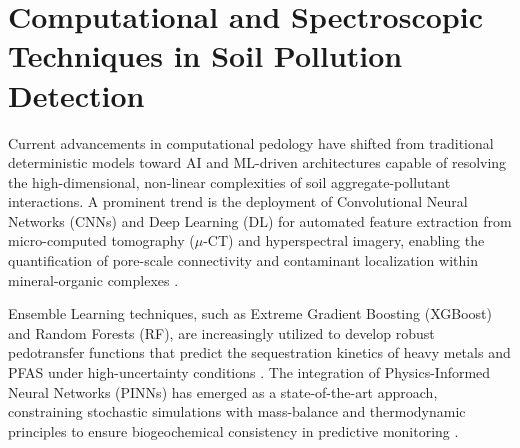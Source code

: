 \documentclass[land,article,submit,pdftex,moreauthors]{Definitions/mdpi}
\begin{document}
\section{Computational and Spectroscopic Techniques in Soil Pollution
    Detection}\label{sec3}

Current advancements in computational pedology have shifted from traditional
deterministic models toward AI and ML-driven architectures capable of
resolving the high-dimensional, non-linear complexities of soil
aggregate-pollutant interactions. A prominent trend is the deployment of
Convolutional Neural Networks (CNNs) and Deep Learning (DL) for automated
feature extraction from micro-computed tomography ($\mu$-CT) and hyperspectral
imagery, enabling the quantification of pore-scale connectivity and contaminant
localization within mineral-organic complexes \cite{Demiral2026,Fan2025}.

Ensemble Learning techniques, such as Extreme Gradient Boosting (XGBoost) and
Random Forests (RF), are increasingly utilized to develop robust pedotransfer
functions that predict the sequestration kinetics of heavy metals and PFAS
under high-uncertainty conditions \cite{Sahab2025,Wadoux2024}. The integration
of Physics-Informed Neural Networks (PINNs) has emerged as a state-of-the-art
approach, constraining stochastic simulations with mass-balance and
thermodynamic principles to ensure biogeochemical consistency in predictive
monitoring \cite{Karpatne2024,Nguyen2025}.
\end{document}
